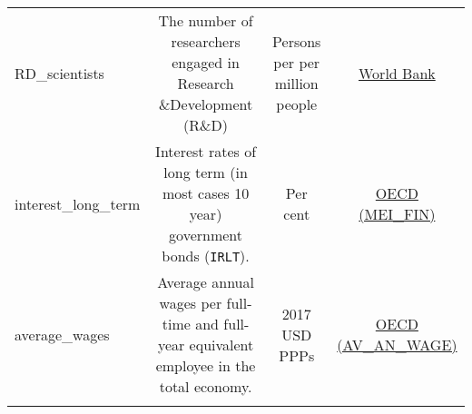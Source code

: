 \documentclass[]{article}
\begin{document}
\begin{longtable}[]{@{}lccc@{}}
\begin{minipage}[t]{0.14\columnwidth}\raggedright\strut
RD\_scientists\strut
\end{minipage} & \begin{minipage}[t]{0.36\columnwidth}\centering\strut
The number of researchers engaged in Research \&Development (R\&D)\strut
\end{minipage} & \begin{minipage}[t]{0.24\columnwidth}\centering\strut
Persons per per million people\strut
\end{minipage} & \begin{minipage}[t]{0.15\columnwidth}\centering\strut
\href{https://data.worldbank.org/indicator/SP.POP.SCIE.RD.P6}{World
Bank}\strut
\end{minipage}\tabularnewline
\begin{minipage}[t]{0.14\columnwidth}\raggedright\strut
interest\_long\_term\strut
\end{minipage} & \begin{minipage}[t]{0.36\columnwidth}\centering\strut
Interest rates of long term (in most cases 10 year) government bonds
(\texttt{IRLT}).\strut
\end{minipage} & \begin{minipage}[t]{0.24\columnwidth}\centering\strut
Per cent\strut
\end{minipage} & \begin{minipage}[t]{0.15\columnwidth}\centering\strut
\href{https://stats.oecd.org/Index.aspx?DataSetCode=MEI_FIN}{OECD
(MEI\_FIN)}\strut
\end{minipage}\tabularnewline
\begin{minipage}[t]{0.14\columnwidth}\raggedright\strut
average\_wages\strut
\end{minipage} & \begin{minipage}[t]{0.36\columnwidth}\centering\strut
Average annual wages per full-time and full-year equivalent employee in
the total economy.\strut
\end{minipage} & \begin{minipage}[t]{0.24\columnwidth}\centering\strut
2017 USD PPPs\strut
\end{minipage} & \begin{minipage}[t]{0.15\columnwidth}\centering\strut
\href{https://stats.oecd.org/Index.aspx?DataSetCode=AV_AN_WAGE}{OECD
(AV\_AN\_WAGE)}\strut
\end{minipage}\tabularnewline
\begin{minipage}[t]{0.14\columnwidth}\raggedright\strut

\end{minipage}
\end{longtable}
\end{document}
